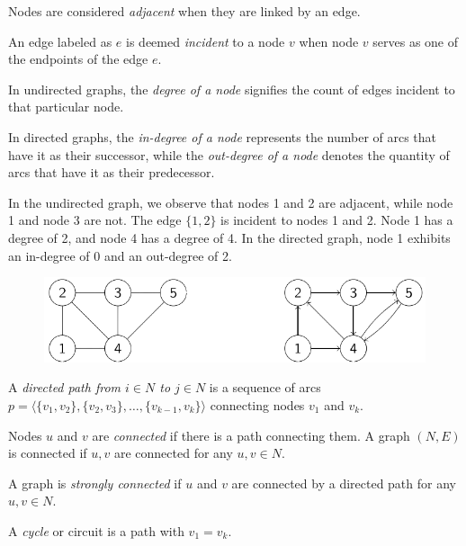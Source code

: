 \documentclass[12pt, a4paper]{report}
\begin{document}
    \begin{definition}
        Nodes are considered \emph{adjacent} when they are linked by an edge.
        
        An edge labeled as $e$ is deemed \emph{incident} to a node $v$ when node $v$ serves as one of the endpoints of the edge $e$.
        
        In undirected graphs, the \emph{degree of a node} signifies the count of edges incident to that particular node. 
        
        In directed graphs, the \emph{in-degree of a node} represents the number of arcs that have it as their successor, while the \emph{out-degree of a node} denotes the quantity of arcs that have it as their predecessor.
    \end{definition}
    \begin{example}
        In the undirected graph, we observe that nodes 1 and 2 are adjacent, while node 1 and node 3 are not. 
        The edge $\{1,2\}$ is incident to nodes 1 and 2. 
        Node 1 has a degree of 2, and node 4 has a degree of 4.
        In the directed graph, node 1 exhibits an in-degree of 0 and an out-degree of 2.
        \begin{figure}[H]
            \centering
            \includegraphics[width=0.75\linewidth]{images/graph.png}
        \end{figure}
    \end{example}
    \begin{definition}
        A \emph{directed path from $i \in N$ to $j \in N$} is a sequence of arcs $p=\langle \{v_1,v_2\},\{v_2,v_3\},\dots,\{v_{k-1},v_k\}\rangle $ connecting nodes $v_1$ and $v_k$.

        Nodes $u$ and $v$ are \emph{connected} if there is a path connecting them. A graph $(N,E)$ is connected if $u,v$ are connected for any $u,v \in N$. 
        
        A graph is \emph{strongly connected} if $u$ and $v$ are connected by a directed path for any $u,v \in N$. 
        
        A \emph{cycle} or circuit is a path with $v_1=v_k$.
    \end{definition}
\end{document}
